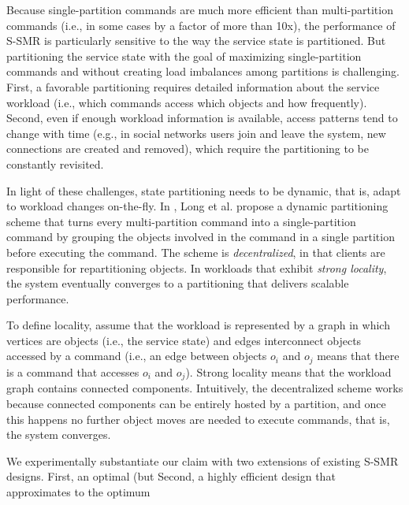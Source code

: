 Because single-partition commands are much more efficient than multi-partition commands (i.e., in some cases by a factor of more than 10x), the performance of S-SMR is particularly sensitive to the way the service state is partitioned.
But partitioning the service state with the goal of maximizing single-partition commands and without creating load imbalances among partitions is challenging.
First, a favorable partitioning requires detailed information about the service workload (i.e., which commands access which objects and how frequently).
Second, even if enough workload information is available, access patterns tend to change with time (e.g., in social networks users join and leave the system, new connections are created and removed), which require the partitioning to be constantly revisited.

In light of these challenges, state partitioning needs to be dynamic, that is, adapt to workload changes on-the-fly.
In \cite{hoang2016}, Long et al. propose a dynamic partitioning scheme that turns every multi-partition command into a single-partition command by grouping the objects involved in the command in a single partition before executing the command.
The scheme is \emph{decentralized}, in that clients are responsible for repartitioning objects.
In workloads that exhibit \emph{strong locality}, the system eventually converges to a partitioning that delivers scalable performance.

To define locality, assume that the workload is represented by a graph in which vertices are objects (i.e., the service state) and edges interconnect objects accessed by a command (i.e., an edge between objects $o_i$ and $o_j$ means that there is a command that accesses $o_i$ and $o_j$).
Strong locality means that the workload graph contains connected components.
Intuitively, the decentralized scheme works because connected components can be entirely hosted by a partition, and once this happens no further object moves are needed to execute commands, that is, the system converges.

\vspace{30mm}

We experimentally substantiate our claim with two extensions of existing S-SMR designs.
First, an optimal (but 
Second, a highly efficient design that approximates to the optimum


